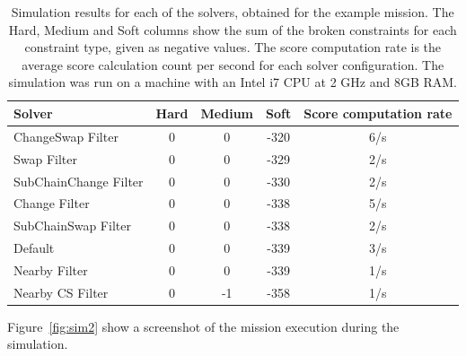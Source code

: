 \documentclass[runningheads,a4paper]{llncs}
\begin{document}
\begin{table}
	\begin{center}
		\begin{tabular}{ | l | c | c | c | c |}
	\hline
   Solver & Hard & Medium & Soft & Score computation rate\\ \hline
   ChangeSwap Filter & 0 & 0 & -320 & 6/s \\ \hline
   Swap Filter & 0 & 0 & -329 & 2/s \\ \hline
   SubChainChange Filter & 0 & 0 & -330 & 2/s \\ \hline
   Change Filter & 0 & 0 & -338 & 5/s \\ \hline
   SubChainSwap Filter & 0 & 0 & -338 & 2/s \\ \hline
   Default & 0 & 0 & -339 & 3/s \\ \hline
   Nearby Filter & 0 & 0 & -339 & 1/s \\ \hline
   Nearby CS Filter & 0 & -1 & -358 & 1/s \\ \hline
		\end{tabular}
	\end{center}
	\caption{Simulation results for each of the solvers, obtained for the example mission. The Hard, Medium and Soft columns show the sum of the broken constraints for each constraint type, given as negative values. The score computation rate is the average score calculation count per second for each solver configuration. The simulation was run on a machine with an Intel i7 CPU at 2 GHz and 8GB RAM.}
	\label{table:score}
\end{table}

Figure~\ref{fig:sim2} show a screenshot of the mission execution during the simulation.

\end{document}

